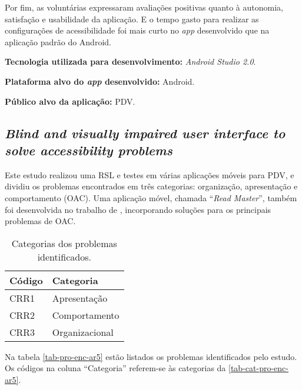 Por fim, as voluntárias expressaram avaliações positivas quanto à autonomia, satisfação e usabilidade da aplicação.
E o tempo gasto para realizar as configurações de acessibilidade foi mais curto no \emph{app} desenvolvido que na aplicação padrão do Android.

\textbf{Tecnologia utilizada para desenvolvimento:} \emph{Android Studio 2.0}.

\textbf{Plataforma alvo do \emph{app} desenvolvido:} Android.

\textbf{Público alvo da aplicação:} PDV\@.

\subsection{\emph{Blind and visually impaired user interface to solve accessibility problems}}

Este estudo realizou uma RSL e testes em várias aplicações móveis para PDV, e dividiu os problemas encontrados em três categorias: organização, apresentação e comportamento (OAC).
Uma aplicação móvel, chamada ``\emph{Read Master}'', também foi desenvolvida no trabalho de , incorporando soluções para os principais problemas de OAC\@.

\begin{table}[htb]
    \begin{center}
        \ABNTEXfontereduzida
        \caption{Categorias dos problemas identificados.}
        \label{tab-cat-pro-enc-ar5}
        \begin{tabular}{p{2.0cm}|p{5.0cm}}
            \textbf{Código} & \textbf{Categoria} \\
            \hline
            CRR1            & Apresentação       \\
            \hline
            CRR2            & Comportamento      \\
            \hline
            CRR3            & Organizacional     \\
        \end{tabular}
    \end{center}
\end{table}

Na tabela \autoref{tab-pro-enc-ar5} estão listados os problemas identificados pelo estudo.
Os códigos na coluna ``Categoria'' referem-se às categorias da \autoref{tab-cat-pro-enc-ar5}.

